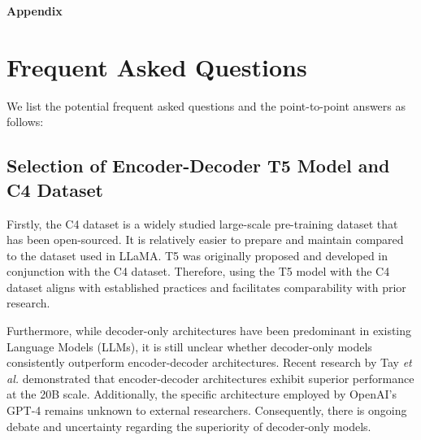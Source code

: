 \documentclass{article}
\begin{document}










\printbibliography

\newpage
\appendix
\noindent\textbf{\Large Appendix}

\section{Frequent Asked Questions}

We list the potential frequent asked questions and the point-to-point answers as follows:


\subsection{Selection of Encoder-Decoder T5 Model and C4 Dataset}

Firstly, the C4 dataset is a widely studied large-scale pre-training dataset that has been open-sourced. It is relatively easier to prepare and maintain compared to the dataset used in LLaMA. T5 was originally proposed and developed in conjunction with the C4 dataset. Therefore, using the T5 model with the C4 dataset aligns with established practices and facilitates comparability with prior research.

Furthermore, while decoder-only architectures have been predominant in existing Language Models (LLMs), it is still unclear whether decoder-only models consistently outperform encoder-decoder architectures. Recent research by Tay \textit{et al.} \cite{tay2022unifying} demonstrated that encoder-decoder architectures exhibit superior performance at the 20B scale. Additionally, the specific architecture employed by OpenAI's GPT-4 remains unknown to external researchers. Consequently, there is ongoing debate and uncertainty regarding the superiority of decoder-only models.
\end{document}
